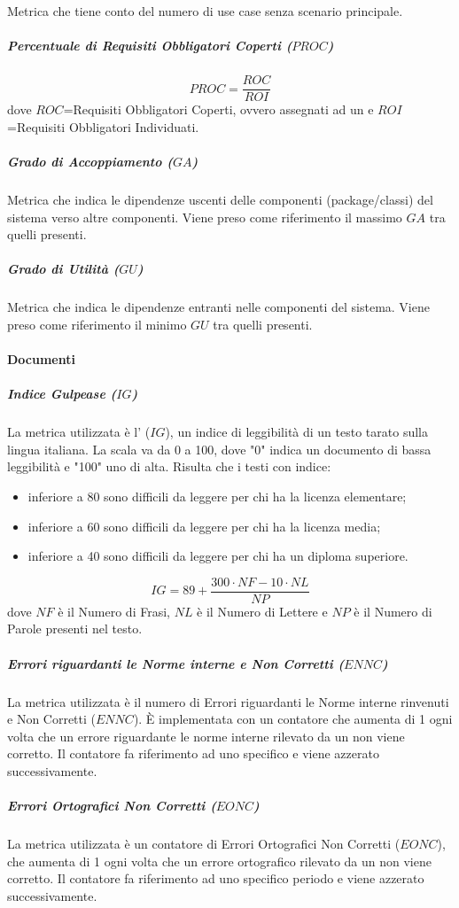 				Metrica che tiene conto del numero di use case senza scenario principale.
				\subparagraph{Percentuale di Requisiti Obbligatori Coperti ($PROC$)} \label{PROC}
				$$PROC=\frac{ROC}{ROI}$$
				dove $ROC$=Requisiti Obbligatori Coperti, ovvero assegnati ad un  e $ROI$=Requisiti Obbligatori Individuati.
				\subparagraph{Grado di Accoppiamento ($GA$)} \label{GA}
				Metrica che indica le dipendenze uscenti delle componenti (package/classi) del sistema verso altre componenti. 
				Viene preso come riferimento il massimo $GA$ tra quelli presenti.
				\subparagraph{Grado di Utilità ($GU$)} \label{GU}
				Metrica che indica le dipendenze entranti nelle componenti del sistema.
				Viene preso come riferimento il minimo $GU$ tra quelli presenti.
			\paragraph{Documenti}
				\subparagraph{Indice Gulpease ($IG$)} \label{IG}
				La metrica utilizzata è l' ($IG$), un indice di leggibilità di un testo tarato sulla lingua italiana. La scala va da 0 a 100, dove "0" indica un documento di bassa leggibilità e "100" uno di alta. Risulta che i testi con indice:
				\begin{itemize}
					\item inferiore a 80 sono difficili da leggere per chi ha la licenza elementare;
					\item inferiore a 60 sono difficili da leggere per chi ha la licenza media;
					\item inferiore a 40 sono difficili da leggere per chi ha un diploma superiore.
				\end{itemize}
				$$IG=89 + \frac{300\cdot{}NF-10\cdot{}NL}{NP}$$
				dove $NF$ è il Numero di Frasi, $NL$ è il Numero di Lettere e $NP$ è il Numero di Parole presenti nel testo.
				\subparagraph{Errori riguardanti le Norme interne e Non Corretti ($ENNC$)} \label{ENNC}
				La metrica utilizzata è il numero di Errori riguardanti le Norme interne rinvenuti e Non Corretti ($ENNC$). È implementata con un contatore che aumenta di 1 ogni volta che un errore riguardante le norme interne rilevato da un \verificatore{} non viene corretto. Il contatore fa riferimento ad uno specifico  e viene azzerato successivamente.
				\subparagraph{Errori Ortografici Non Corretti ($EONC$)} \label{EONC}
				La metrica utilizzata è un contatore di Errori Ortografici Non Corretti ($EONC$), che aumenta di 1 ogni volta che un errore ortografico rilevato da un \verificatore{} non viene corretto. Il contatore fa riferimento ad uno specifico periodo e viene azzerato successivamente.
